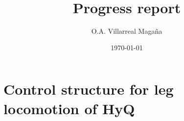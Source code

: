 \documentclass[a4paper]{article}
\title{Progress report}
\author{O.A. Villarreal Maga\~na}
\date{\today}
\begin{document}
\maketitle
\thispagestyle{empty}

\setcounter{page}{1}








 
 
%

\section{Control structure for leg locomotion of HyQ}


%






%
\newpage

{}
%
%
%
%
\cleardoublepage
\end{document}
